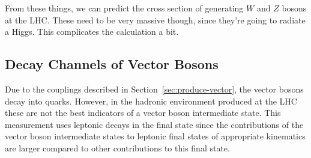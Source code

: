 From these things, we can predict the cross section of generating $W$ and $Z$ bosons at the LHC.
These need to be very massive though, since they're going to radiate a Higgs.
This complicates the calculation a bit.


\subsection{Decay Channels of Vector Bosons} \label{sec:v-decay}

Due to the couplings described in Section~\ref{sec:produce-vector},
the vector bosons decay into quarks.
However, in the hadronic environment produced at the LHC
these are not the best indicators of a vector boson intermediate state.
This measurement uses leptonic decays in the final state
since the contributions of the vector boson intermediate states to leptonic final states
of appropriate kinematics are larger compared to other contributions to this final state.

